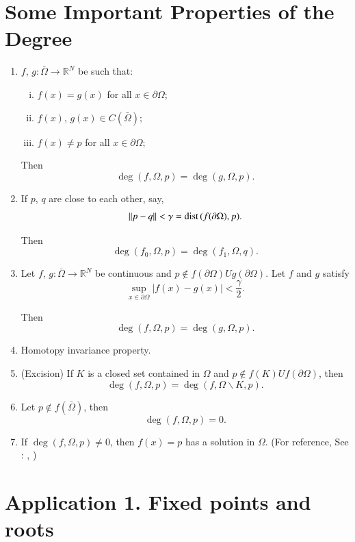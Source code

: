 \section*{Some Important Properties of the Degree}
\begin{enumerate}[(1)]
\item $f$, $g : \bar{\Omega} \to \mathbb{R}^N$ be such that:
\begin{enumerate}[(i)]
\item $f(x) = g(x) $ for all $x \in \partial  \Omega$;

\item $f(x)$, $g(x) \in C (\bar{\Omega})$;

\item $f(x) \neq p$ for all $x \in \partial \Omega$;
\end{enumerate}

Then 
$$
\deg (f , \Omega , p) = \deg (g, \Omega , p). 
$$

\item If $p$, $q$ are close to each other, say,
$$
|| p-q || < \gamma = \text{dist\,} (f (\partial \Omega) ,p). 
$$

Then\pageoriginale 
$$
\deg (f_0 , \Omega , p) = \deg (f_1 , \Omega , q).  
$$

\item Let $f$, $g : \bar{\Omega} \to \mathbb{R}^N$ be continuous and $p
  \notin f(\partial \Omega) U  g(\partial  \Omega) $. Let $f$ and $g$
  satisfy  
$$
\sup_{x \in \partial  \Omega} | f(x) - g(x) | <
\frac{\gamma}{2}. 
$$

Then 
$$
\deg (f , \Omega , p) = \deg (g , \Omega , p). 
$$

\item Homotopy invariance property.

\item (Excision) If $K$ is a closed set contained in $\Omega$ and $p
  \notin f(K) U f ( \partial \Omega) $, then  
$$
\deg (f, \Omega , p) = \deg (f , \Omega  \backslash  K , p). 
$$

\item Let $p \notin f (\bar{\Omega})$, then  
$$
\deg (f, \Omega , p) = 0.
$$

\item If $\deg (f, \Omega , p) \neq 0$, then $f (x) = p$ has a
  solution in $\Omega$. (For reference, See : \cite{key26}, \cite{key29}) 
\end{enumerate}

\section*{Application 1. Fixed points and roots}

